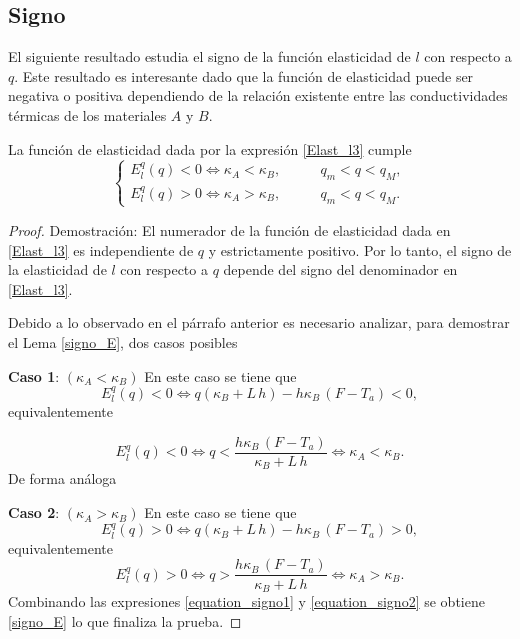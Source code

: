 \subsection{Signo} \label{subsec:Signo}
%
El siguiente resultado estudia el signo de la funci\'on elasticidad de $l$ con respecto a $q$. Este resultado es interesante dado que la funci\'on de elasticidad puede ser negativa o positiva dependiendo de la relaci\'on existente entre las conductividades t\'ermicas de los materiales $A$ y $B$.      
%
\begin{lem} \label{signo}
%
La funci\'on de elasticidad dada por la expresi\'on \eqref{Elast_l3} cumple
%
%
\begin{equation}
\label{signo_E}
\begin{cases}
E_{l}^{q}(q)<0 \Longleftrightarrow \kappa_A < \kappa_B, \qquad & q_m<q<q_M, \\ 
E_{l}^{q}(q)>0 \Longleftrightarrow \kappa_A > \kappa_B, \qquad & q_m<q<q_M.
\end{cases}
\end{equation}
%
\end{lem}
%
\begin{proof}{Demostraci\'on:}
%
El numerador de la funci\'on de elasticidad dada en \eqref{Elast_l3} es independiente de $q$ y estrictamente positivo.
Por lo tanto, el signo de la elasticidad de $l$ con respecto a $q$ depende del signo del denominador en \eqref{Elast_l3}.

Debido a lo observado en el p\'arrafo anterior es necesario analizar, para demostrar el Lema \ref{signo_E}, dos casos posibles 

\textbf{Caso 1}:  $(\kappa_A < \kappa_B)$
En este caso se tiene que 
%
\begin{equation*}
E_{l}^{q}(q)<0 \Longleftrightarrow q(\kappa_B+L \, h)-h \kappa_B \,(F-T_a)<0, 
\end{equation*}
%
equivalentemente 

\begin{equation}
\label{equation_signo1}
E_{l}^{q}(q)<0 \Longleftrightarrow q < \dfrac{h \kappa_B \,(F-T_a)}{\kappa_B+L \, h} \Longleftrightarrow \kappa_A<\kappa_B. 
\end{equation}
%
De forma an\'aloga

\textbf{Caso 2}:  $(\kappa_A > \kappa_B)$
En este caso se tiene que 
%
\begin{equation*}
E_{l}^{q}(q)>0 \Longleftrightarrow q(\kappa_B+L \, h)-h \kappa_B \,(F-T_a)>0, 
\end{equation*}
%
equivalentemente 
%
\begin{equation}
\label{equation_signo2}
E_{l}^{q}(q)>0 \Longleftrightarrow q > \dfrac{h \kappa_B \,(F-T_a)}{\kappa_B+L \, h} \Longleftrightarrow \kappa_A>\kappa_B. 
\end{equation}
%
Combinando las expresiones \eqref{equation_signo1} y \eqref{equation_signo2} se obtiene \eqref{signo_E} lo que finaliza la prueba.
%
\end{proof}
%

